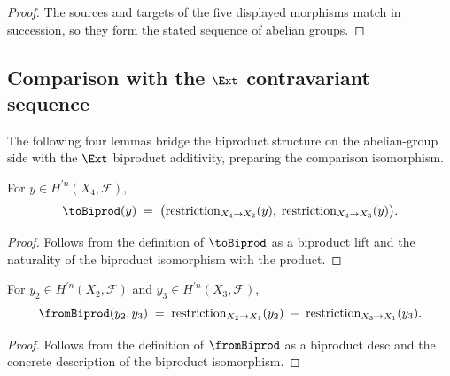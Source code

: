 \begin{proof}

  \leanok
  The sources and targets of the five displayed morphisms match in succession, so they form the stated sequence of abelian groups.
\end{proof}

\subsection{Comparison with the \(\Ext\) contravariant sequence}

The following four lemmas bridge the biproduct structure on the abelian-group side with the \(\Ext\) biproduct additivity, preparing the comparison isomorphism.

\begin{lemma}\leanok
  \label{lem:Scheme_HModule_prime_toBiprod_apply}

  For \(y \in H^{\prime n}(X_4, \mathcal F)\),
  \[
    \toBiprod(y) \;=\; \bigl(\mathrm{restriction}_{X_4 \to X_2}(y),\; \mathrm{restriction}_{X_4 \to X_3}(y)\bigr).
  \]
\end{lemma}

\begin{proof}

  \leanok
  Follows from the definition of \(\toBiprod\) as a biproduct lift and the naturality of the biproduct isomorphism with the product.
\end{proof}

\begin{lemma}\leanok
  \label{lem:Scheme_HModule_prime_fromBiprod_biprodIsoProd_inv_apply}

  For \(y_2 \in H^{\prime n}(X_2, \mathcal F)\) and \(y_3 \in H^{\prime n}(X_3, \mathcal F)\),
  \[
    \fromBiprod(y_2, y_3) \;=\; \mathrm{restriction}_{X_2 \to X_1}(y_2) \;-\; \mathrm{restriction}_{X_3 \to X_1}(y_3).
  \]
\end{lemma}

\begin{proof}

  \leanok
  Follows from the definition of \(\fromBiprod\) as a biproduct desc and the concrete description of the biproduct isomorphism.
\end{proof}

